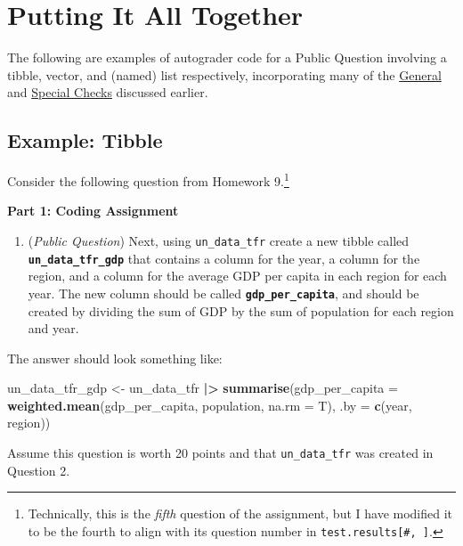 \documentclass[
  12pt,
]{book}
\newenvironment{Shaded}{\begin{snugshade}}{\end{snugshade}}
\newcommand{\AttributeTok}[1]{\textcolor[rgb]{0.13,0.29,0.53}{#1}}
\newcommand{\FunctionTok}[1]{\textcolor[rgb]{0.13,0.29,0.53}{\textbf{#1}}}
\newcommand{\NormalTok}[1]{#1}
\newcommand{\OtherTok}[1]{\textcolor[rgb]{0.56,0.35,0.01}{#1}}
\newcommand{\SpecialCharTok}[1]{\textcolor[rgb]{0.81,0.36,0.00}{\textbf{#1}}}
\providecommand{\tightlist}{%
  \setlength{\itemsep}{0pt}\setlength{\parskip}{0pt}}
\begin{document}
\chapter{Putting It All Together}\label{Putting-It-All-Together}

The following are examples of autograder code for a Public Question involving a tibble, vector, and (named) list respectively, incorporating many of the \hyperref[General-Checks]{General} and \hyperref[Special-Checks]{Special Checks} discussed earlier.

\section{Example: Tibble}\label{example-tibble}

Consider the following question from Homework 9.\footnote{Technically, this is the \emph{fifth} question of the assignment, but I have modified it to be the fourth to align with its question number in \texttt{test.results{[}\#,\ {]}}.}

\textbf{Part 1: Coding Assignment}

\begin{enumerate}
\def\labelenumi{\arabic{enumi}.}
\setcounter{enumi}{3}
\tightlist
\item
  (\emph{Public Question}) Next, using \texttt{un\_data\_tfr} create a new tibble called \textbf{\texttt{un\_data\_tfr\_gdp}} that contains a column for the year, a column for the region, and a column for the average GDP per capita in each region for each year. The new column should be called \textbf{\texttt{gdp\_per\_capita}}, and should be created by dividing the sum of GDP by the sum of population for each region and year.
\end{enumerate}

The answer should look something like:

\begin{Shaded}
\begin{Highlighting}[]
\NormalTok{un\_data\_tfr\_gdp }\OtherTok{\textless{}{-}}\NormalTok{ un\_data\_tfr }\SpecialCharTok{|\textgreater{}}
  \FunctionTok{summarise}\NormalTok{(}\AttributeTok{gdp\_per\_capita =} \FunctionTok{weighted.mean}\NormalTok{(gdp\_per\_capita, population, }\AttributeTok{na.rm =}\NormalTok{ T),}
            \AttributeTok{.by =} \FunctionTok{c}\NormalTok{(year, region))}
\end{Highlighting}
\end{Shaded}

Assume this question is worth 20 points and that \texttt{un\_data\_tfr} was created in Question 2.
\end{document}
